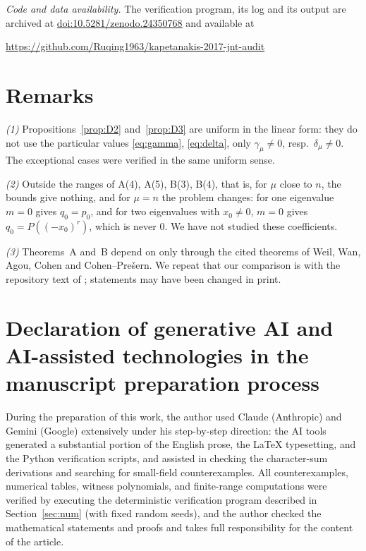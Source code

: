 \documentclass[11pt,a4paper]{amsart}
\theoremstyle{remark}
\begin{document}
\emph{Code and data availability.} The verification program, its log and its output are archived at
\href{https://doi.org/10.5281/zenodo.24350768}{doi:10.5281/zenodo.24350768} \cite{Repo} and available at
\begin{center}
\url{https://github.com/Ruqing1963/kapetanakis-2017-jnt-audit}
\end{center}

\section{Remarks}\label{sec:rem}

\emph{(1)} Propositions~\ref{prop:D2} and~\ref{prop:D3} are uniform in the linear form: they do not use the
particular values \eqref{eq:gamma}, \eqref{eq:delta}, only $\gamma_\mu\ne0$, resp.\ $\delta_\mu\ne0$. The
exceptional cases were verified in the same uniform sense.

\emph{(2)} Outside the ranges of A(4), A(5), B(3), B(4), that is, for $\mu$ close to $n$, the bounds give
nothing, and for $\mu=n$ the problem changes: for one eigenvalue $m=0$ gives $q_0=p_0$, and for two eigenvalues
with $x_0\ne0$, $m=0$ gives $q_0=P((-x_0)^r)$, which is never $0$. We have not studied these coefficients.

\emph{(3)} Theorems~A and~B depend on \cite{K} only through the cited theorems of Weil, Wan, Agou, Cohen and
Cohen--Pre\v{s}ern. We repeat that our comparison is with the repository text of \cite{K}; statements may have
been changed in print.

\section*{Declaration of generative AI and AI-assisted technologies in the manuscript preparation process}
During the preparation of this work, the author used Claude (Anthropic) and Gemini (Google) extensively under
his step-by-step direction: the AI tools generated a substantial portion of the English prose, the LaTeX
typesetting, and the Python verification scripts, and assisted in checking the character-sum derivations and
searching for small-field counterexamples. All counterexamples, numerical tables, witness polynomials, and
finite-range computations were verified by executing the deterministic verification program described in
Section~\ref{sec:num} (with fixed random seeds), and the author checked the mathematical statements and proofs
and takes full responsibility for the content of the article.
\end{document}
